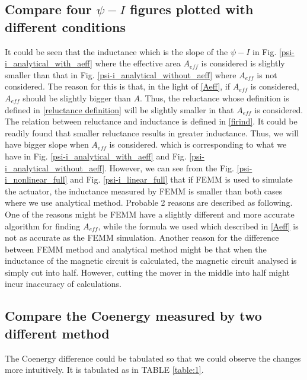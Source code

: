 \documentclass[a4paper]{IEEEtran}
\begin{document}
{\subsection{Compare four $\psi-I$ figures plotted with different conditions}
It could be seen that the inductance which is the slope of the $\psi-I$ in Fig. \ref{psi-i_analytical_with_aeff} where the 
effective area $A_{eff}$ is considered
is slightly smaller than that in Fig. \ref{psi-i_analytical_without_aeff} where $A_{eff}$ is not considered. 
The reason for this is that, in the light of \eqref{Aeff},
if $A_{eff}$ is considered, $A_{eff}$ should be slightly bigger than $A$. 
Thus, the reluctance whose definition is defined in \eqref{reluctance definition}
will be slightly smaller in that $A_{eff}$ is considered. The relation between reluctance and inductance is defined in \eqref{firind}.
It could be readily found that smaller reluctance results in greater inductance. Thus, we will have bigger slope when $A_{eff}$ is considered.
which is corresponding to what we have in Fig. \ref{psi-i_analytical_with_aeff} and Fig. \ref{psi-i_analytical_without_aeff}.
However, we can see from the Fig. \ref{psi-i_nonlinear_full} and Fig. \ref{psi-i_linear_full} that if FEMM is used to simulate the actuator,
the inductance measured by FEMM is smaller than both cases where we use analytical method. Probable 2 reasons are described as following. 
One of the reasons might be FEMM have a slightly different
and more accurate algorithm for finding $A_{eff}$, while the formula we used which described in \eqref{Aeff} is not as accurate as the FEMM simulation.
Another reason for the difference between FEMM method and analytical method might be that when the inductance of the magnetic circuit is calculated, 
the magnetic circuit analysed is simply cut into half. However, cutting the mover in the middle into half might incur inaccuracy of calculations.\par
\subsection{Compare the Coenergy measured by two different method}
The Coenergy difference could be tabulated so that we could observe the changes more intuitively.
It is tabulated as in TABLE \ref{table:1}.

}
\end{document}
